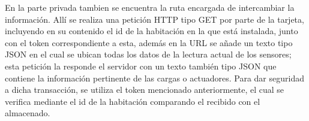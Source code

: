 En la parte privada tambien se encuentra la ruta encargada de intercambiar la información. Allí se realiza una petición HTTP tipo GET por parte de la tarjeta, incluyendo en su contenido el id de la habitación en la que está instalada, junto con el token correspondiente a esta, además en la URL se añade un texto tipo JSON en el cual se ubican todas los datos de la lectura actual de los sensores; esta petición la responde el servidor con un texto también tipo JSON que contiene la información pertinente de las cargas o actuadores. Para dar seguridad a dicha transacción, se utiliza el token mencionado anteriormente, el cual se verifica mediante el id de la habitación comparando el recibido con el almacenado.